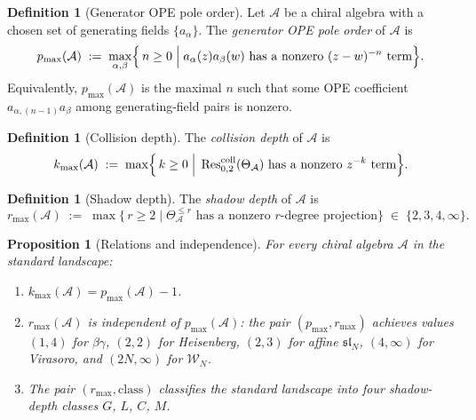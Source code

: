 \documentclass[11pt]{article}
\theoremstyle{plain}
\newtheorem{proposition}[theorem]{Proposition}
\theoremstyle{definition}
\newtheorem{definition}[theorem]{Definition}
\theoremstyle{remark}
\newcommand{\fsl}{\mathfrak{sl}}
\newcommand{\cA}{\mathcal{A}}
\newcommand{\Walg}{\mathcal{W}}
\newcommand{\Res}{\operatorname{Res}}
\begin{document}
\begin{definition}[Generator OPE pole order]\label{def:p-max}
Let $\cA$ be a chiral algebra with a chosen set of generating
fields $\{a_{\alpha}\}$. The \emph{generator OPE pole order}
of $\cA$ is
\[
 p_{\max}(\cA) \;:=\;
 \max_{\alpha,\beta}\Bigl\{\,n\geq 0\;\Big|\;
 a_{\alpha}(z)a_{\beta}(w)\text{ has a nonzero }
 (z-w)^{-n}\text{ term}\Bigr\}.
\]
Equivalently, $p_{\max}(\cA)$ is the maximal $n$ such that some
OPE coefficient $a_{\alpha,(n-1)}a_{\beta}$ among generating-field
pairs is nonzero.
\end{definition}

\begin{definition}[Collision depth]\label{def:k-max}
The \emph{collision depth} of $\cA$ is
\[
 k_{\max}(\cA) \;:=\;
 \max\Bigl\{\,k\geq 0\;\Big|\;
 \Res^{\mathrm{coll}}_{0,2}(\Theta_{\cA})
 \text{ has a nonzero }z^{-k}\text{ term}\Bigr\}.
\]
\end{definition}

\begin{definition}[Shadow depth]\label{def:r-max}
The \emph{shadow depth} of $\cA$ is
\[
 r_{\max}(\cA) \;:=\;
 \max\bigl\{\,r\geq 2\;\big|\;
 \Theta_{\cA}^{\leq r}\text{ has a nonzero $r$-degree projection}\bigr\}
 \;\in\;\{2,3,4,\infty\}.
\]
\end{definition}

\begin{proposition}[Relations and independence]\label{prop:three-invariants}
For every chiral algebra $\cA$ in the standard landscape:
\begin{enumerate}[label=\textup{(\roman*)}]
 \item $k_{\max}(\cA) = p_{\max}(\cA) - 1$.
 \item $r_{\max}(\cA)$ is independent of $p_{\max}(\cA)$: the pair
 $(p_{\max}, r_{\max})$ achieves values
 $(1, 4)$ for $\beta\gamma$,
 $(2, 2)$ for Heisenberg,
 $(2, 3)$ for affine $\fsl_N$,
 $(4, \infty)$ for Virasoro, and
 $(2N, \infty)$ for $\Walg_N$.
 \item The pair $(r_{\max}, \mathrm{class})$ classifies the
 standard landscape into four shadow-depth classes $G$, $L$,
 $C$, $M$.
\end{enumerate}
\end{proposition}
\end{document}
